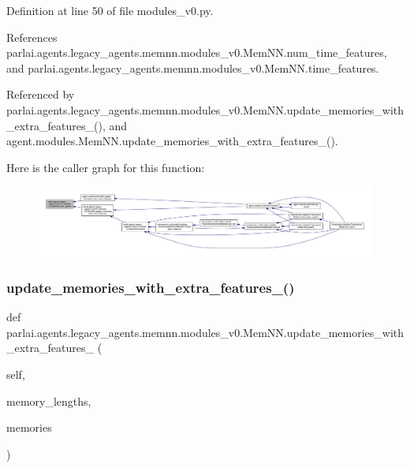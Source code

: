 Definition at line 50 of file modules\+\_\+v0.\+py.



References parlai.\+agents.\+legacy\+\_\+agents.\+memnn.\+modules\+\_\+v0.\+Mem\+N\+N.\+num\+\_\+time\+\_\+features, and parlai.\+agents.\+legacy\+\_\+agents.\+memnn.\+modules\+\_\+v0.\+Mem\+N\+N.\+time\+\_\+features.



Referenced by parlai.\+agents.\+legacy\+\_\+agents.\+memnn.\+modules\+\_\+v0.\+Mem\+N\+N.\+update\+\_\+memories\+\_\+with\+\_\+extra\+\_\+features\+\_\+(), and agent.\+modules.\+Mem\+N\+N.\+update\+\_\+memories\+\_\+with\+\_\+extra\+\_\+features\+\_\+().

Here is the caller graph for this function\+:
\nopagebreak
\begin{figure}[H]
\begin{center}
\leavevmode
\includegraphics[width=350pt]{classparlai_1_1agents_1_1legacy__agents_1_1memnn_1_1modules__v0_1_1MemNN_ab1188b15b34f67153ac59258d646397b_icgraph}
\end{center}
\end{figure}
\mbox{\label{classparlai_1_1agents_1_1legacy__agents_1_1memnn_1_1modules__v0_1_1MemNN_a9da6ab125898ee1ab3744ee5d260b6dd}} 
\subsubsection{\texorpdfstring{update\+\_\+memories\+\_\+with\+\_\+extra\+\_\+features\+\_\+()}{update\_memories\_with\_extra\_features\_()}}
{\footnotesize\ttfamily def parlai.\+agents.\+legacy\+\_\+agents.\+memnn.\+modules\+\_\+v0.\+Mem\+N\+N.\+update\+\_\+memories\+\_\+with\+\_\+extra\+\_\+features\+\_\+ (\begin{DoxyParamCaption}\item[{}]{self,  }\item[{}]{memory\+\_\+lengths,  }\item[{}]{memories }\end{DoxyParamCaption})}



